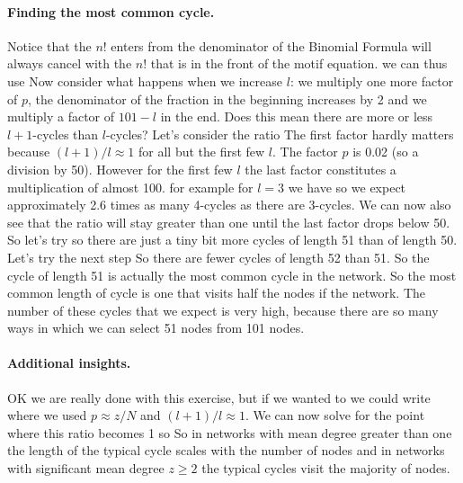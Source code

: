 \paragraph{Finding the most common cycle.}Notice that the $n!$ enters from the denominator of the Binomial Formula will always cancel with the $n!$ that is in the front of the motif equation. we can thus use
Now consider what happens when we increase $l$: we multiply one more factor of $p$, the denominator of the fraction in the beginning increases by 2 and we multiply a factor of $101-l$ in the end. Does this mean there are more or less $l+1$-cycles than $l$-cycles? Let's consider the ratio 
The first factor hardly matters because $(l+1)/l\approx 1$ for all but the first few $l$. The factor $p$ is 0.02 (so a division by 50). However for the first few $l$ the last factor constitutes a multiplication of almost 100. for example for $l=3$ we have 
so we expect approximately 2.6 times as many 4-cycles as there are 3-cycles. We can now also see that the ratio will stay greater than one until the last factor drops below 50. So let's try 
so there are just a tiny bit more cycles of length 51 than of length 50. Let's try the next step
So there are fewer cycles of length 52 than 51. So the cycle of length 51 is actually the most common cycle in the network. So the most common length of cycle is one that visits half the nodes if the network. The number of these cycles that we expect is very high, because there are so many ways in which we can select 51 nodes from 101 nodes.  

\paragraph{Additional insights.}OK we are really done with this exercise, but if we wanted to we could write
where we used $p\approx z/N$ and $(l+1)/l \approx 1$. We can now solve for the point where this ratio becomes 1
so 
So in networks with mean degree greater than one the length of the typical cycle scales with the number of nodes and in networks with significant mean degree $z\geq 2$ the typical cycles visit the majority of nodes. 
